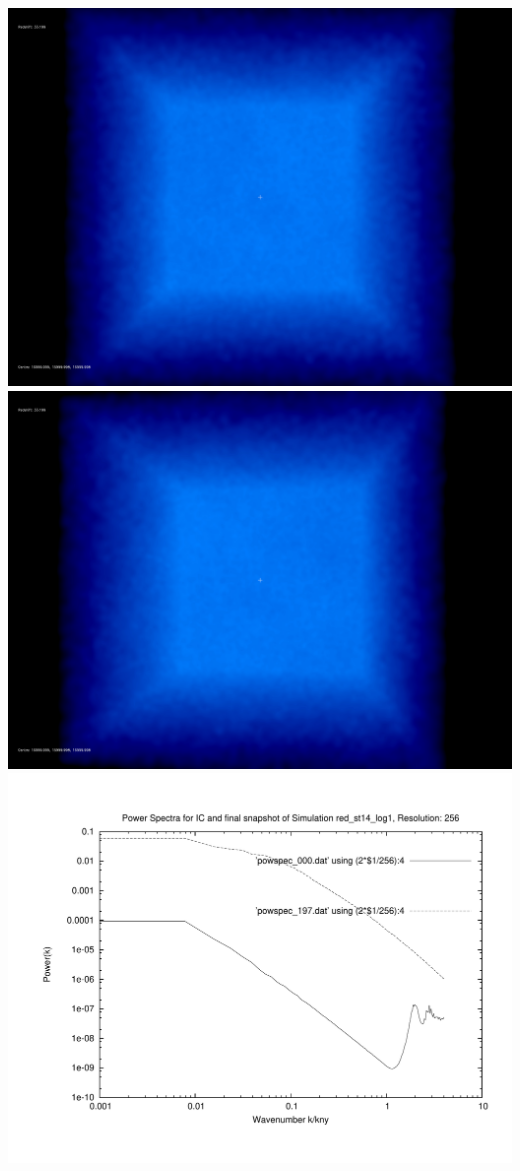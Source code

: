 \includegraphics[scale=0.1]{r256/h100/red_st14_log1/150.jpg} 
\includegraphics[scale=0.1]{r256/h100/red_st14_log1/197.jpg} \\ 

\includegraphics[scale=0.5]{r256/h100/red_st14_log1/plot_powspec_red_st14_log1.pdf}

